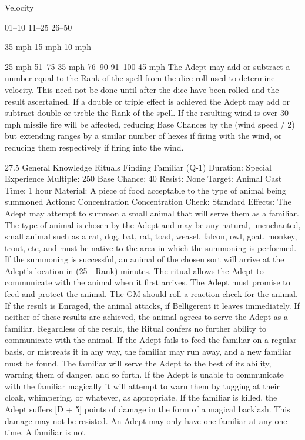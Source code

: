 \documentclass[a4paper]{article}
\begin{document}
\begin{multicols}{3}
Velocity

01–10
11–25
26–50

35 mph
15 mph
10 mph

25 mph
51–75
35 mph
76–90
91–100 45 mph
The Adept may add or subtract a number equal to
the Rank of the spell from the dice roll used to
determine velocity. This need not be done until
after the dice have been rolled and the result ascertained. If a double or triple effect is achieved the
Adept may add or subtract double or treble the
Rank of the spell. If the resulting wind is over 30
mph missile fire will be affected, reducing Base
Chances by the (wind speed / 2) but extending
ranges by a similar number of hexes if firing with
the wind, or reducing them respectively if firing
into the wind.

27.5 General Knowledge Rituals
Finding Familiar (Q-1)
Duration: Special
Experience Multiple: 250
Base Chance: 40%
Resist: None
Target: Animal
Cast Time: 1 hour
Material: A piece of food acceptable to the type of
animal being summoned
Actions: Concentration
Concentration Check: Standard
Effects: The Adept may attempt to summon a small
animal that will serve them as a familiar. The type
of animal is chosen by the Adept and may be any
natural, unenchanted, small animal such as a cat,
dog, bat, rat, toad, weasel, falcon, owl, goat, monkey, trout, etc, and must be native to the area in
which the summoning is performed. If the summoning is successful, an animal of the chosen sort
will arrive at the Adept’s location in (25 - Rank)
minutes. The ritual allows the Adept to communicate with the animal when it first arrives. The
Adept must promise to feed and protect the animal.
The GM should roll a reaction check for the animal. If the result is Enraged, the animal attacks, if
Belligerent it leaves immediately. If neither of
these results are achieved, the animal agrees to
serve the Adept as a familiar. Regardless of the
result, the Ritual confers no further ability to communicate with the animal. If the Adept fails to feed
the familiar on a regular basis, or mistreats it in any
way, the familiar may run away, and a new familiar must be found. The familiar will serve the
Adept to the best of its ability, warning them of
danger, and so forth. If the Adept is unable to
communicate with the familiar magically it will
attempt to warn them by tugging at their cloak,
whimpering, or whatever, as appropriate. If the
familiar is killed, the Adept suffers [D + 5] points
of damage in the form of a magical backlash. This
damage may not be resisted. An Adept may only
have one familiar at any one time. A familiar is not

\end{multicols}
\end{document}
